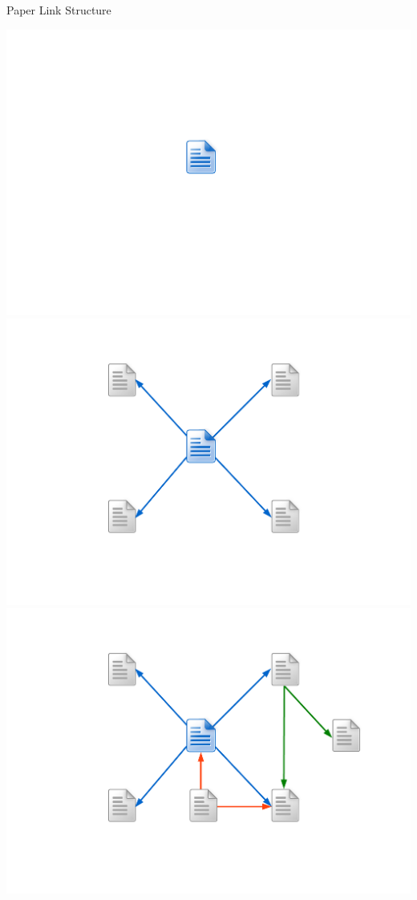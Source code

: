\documentclass[xcolor=dvipsnames]{beamer}
\begin{document}
\begin{frame}{Paper Link Structure}
\begin{center}
 {
    \includegraphics[scale=0.4]{doc_links_doc.pdf}
}
 {
    \includegraphics[scale=0.4]{doc_links_out.pdf}
}
 {
    \includegraphics[scale=0.4]{doc_links_in_out.pdf}
}
\end{center}

\end{frame}
\end{document}
